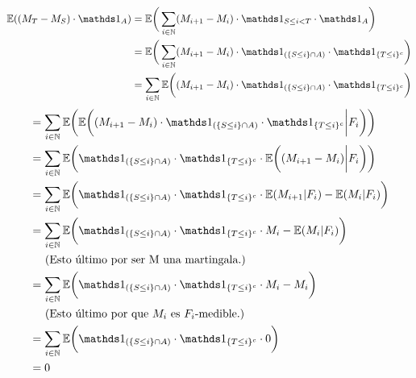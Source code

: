 	 \begin{align}
	 	\E((M_T - M_S) \cdot \indic_A)	
	 									&=		
	 	\E\bigg( \sum_{ i \in \N} ( M_{i+1} - M_i) \cdot \indic_{S \leq i < T } \cdot \indic_A \bigg)									\\
	 									&=		
	 	\E	\bigg( 
	 			\sum_{ i \in \N} 
	 				( M_{i+1} - M_i) \cdot \indic_{(\{S \leq i \} \cap A)} \cdot \indic_{\{ T \leq i \}^c} 
	 		\bigg)																														\\
	 									&=		
	 	\sum_{ i \in \N} 
	 		\E	\bigg(
	 				( M_{i+1} - M_i) \cdot \indic_{(\{S \leq i \} \cap A)} \cdot \indic_{\{ T \leq i \}^c} 
	 			\bigg)																													
	\end{align}
	\begin{align}
	 									&=		
	 	\sum_{ i \in \N} 
	 		\E	\bigg(
		 			\E	\bigg(
		 					( M_{i+1} - M_i) \cdot \indic_{(\{S \leq i \} \cap A)} \cdot \indic_{\{ T \leq i \}^c}  \bigg| F_i	
						\bigg)
	 			\bigg)																													\\
										&=
	 	\sum_{ i \in \N} 
	 		\E	\bigg(
					\indic_{(\{S \leq i \} \cap A)} \cdot \indic_{\{ T \leq i \}^c} \cdot
		 			\E	\bigg(
		 					 ( M_{i+1} - M_i)  \bigg| F_i	 												
						\bigg)
	 			\bigg)																													\\
										&=
	 	\sum_{ i \in \N} 
	 		\E	\bigg(
					\indic_{(\{S \leq i \} \cap A)} \cdot \indic_{\{ T \leq i \}^c} \cdot
		 			\E	(
		 					 M_{i+1} | F_i	 												
						)
					-
					\E	(
		 					 M_i  | F_i	 												
						)
	 			\bigg)																													\\
										&=
	 	\sum_{ i \in \N} 
	 		\E	\bigg(
					\indic_{(\{S \leq i \} \cap A)} \cdot \indic_{\{ T \leq i \}^c} \cdot
		 					 M_i
					-
					\E	(
		 					 M_i  | F_i	 												
						)
	 			\bigg)\label{problema1_4:aplicacion_de_que_M_es_martingala}																\\
										&\;\comment{Esto último por ser M una martingala.}									    		\\
										&=
	 	\sum_{ i \in \N} 
	 		\E	\bigg(
					\indic_{(\{S \leq i \} \cap A)} \cdot \indic_{\{ T \leq i \}^c} \cdot
		 			 M_i
						-
					 M_i
	 			\bigg)																													\\
										&\;\comment{Esto último por que $M_i$ es $F_i$-medible.}										\\
										&=
		\sum_{ i \in \N} 
	 		\E	\bigg(
					\indic_{(\{S \leq i \} \cap A)} \cdot \indic_{\{ T \leq i \}^c} \cdot
		 			 0
	 			\bigg)																													\\
										&=
		0
	 \end{align}\par\null
	
